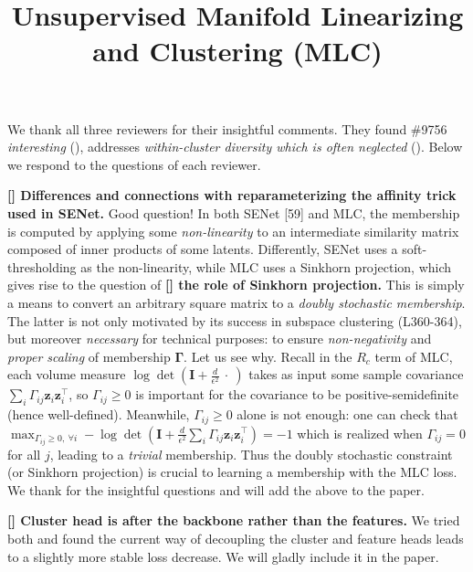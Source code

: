 \documentclass[10pt,twocolumn,letterpaper]{article}
\newcommand{\myparagraph}[1]{\noindent\textbf{#1}}
\newcommand{\Rone}{{\color{blue}{R1}}}
\newcommand{\Rtwo}{{\color{blue}{R2}}}
\def\iccvPaperID{9756} %
\begin{document}
\title{Unsupervised Manifold Linearizing and Clustering (MLC) \vspace{-0.2cm}}  %

\maketitle
\thispagestyle{empty}

We thank all three reviewers for their insightful comments. They found \#\iccvPaperID{} \textit{interesting} (\Rone), addresses \textit{within-cluster diversity which is often neglected}  ({\Rtwo}). Below we respond to the questions of each reviewer.



\smallskip
\myparagraph{[\Rone] Differences and connections with reparameterizing the affinity trick used in SENet.} Good question! In both SENet [59] and MLC, the membership is computed by applying some \textit{non-linearity} to an intermediate similarity matrix composed of inner products of some latents. Differently, SENet uses a soft-thresholding as the non-linearity, while MLC uses a Sinkhorn projection, which gives rise to the question of \myparagraph{[\Rone] the role of Sinkhorn projection.} This is simply a means to convert an arbitrary square matrix to a \textit{doubly stochastic membership}. The latter is not only motivated by its success in subspace clustering (L360-364), but moreover \textit{necessary} for technical purposes: to ensure \textit{non-negativity} and \textit{proper scaling} of membership $\boldsymbol{\Gamma}$. Let us see why.
Recall in the $R_c$ term of MLC, each volume measure $\log\det(\boldsymbol{I}+\frac{d}{\epsilon^2} \ \cdot \ )$ takes as input some sample covariance $\sum_{i} \Gamma_{ij}\boldsymbol{z}_i \boldsymbol{z}_i^\top$, so $\Gamma_{ij} \geq 0$ is important for the covariance to be positive-semidefinite (hence well-defined). Meanwhile, $\Gamma_{ij} \geq 0$ alone is not enough: one can check that $\max_{\Gamma_{ij} \geq 0, \ \forall i}-\log\det(\boldsymbol{I}+\frac{d}{\epsilon^2} \sum_{i} \Gamma_{ij}\boldsymbol{z}_i \boldsymbol{z}_i^\top ) = -1$ which is realized when $\Gamma_{ij} = 0$ for all $j$, leading to a \textit{trivial} membership. Thus the doubly stochastic constraint (or Sinkhorn projection) is crucial to learning a membership with the MLC loss.  We thank \Rone{} for the insightful questions and will add the above to the paper. 

\smallskip
\myparagraph{[\Rone] Cluster head is after the backbone rather than the features.} We tried both and found the current way of decoupling the cluster and feature heads leads to a slightly more stable loss decrease. We will gladly include it in the paper. 
\end{document}
